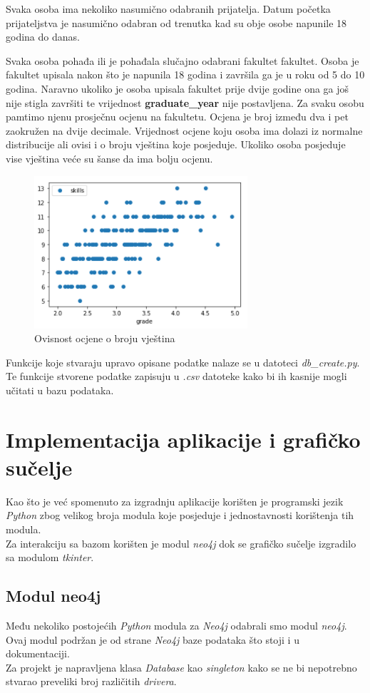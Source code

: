 \documentclass[titlepage, 12pt]{scrartcl}
\begin{document}
Svaka osoba ima nekoliko nasumično odabranih prijatelja. Datum početka prijateljstva je nasumično odabran od trenutka kad su obje osobe napunile 18 godina do danas.

Svaka osoba pohađa ili je pohađala slučajno odabrani fakultet fakultet. Osoba je fakultet upisala nakon što je napunila 18 godina i završila ga je u roku od 5 do 10 godina. Naravno ukoliko je osoba upisala fakultet prije dvije godine ona ga još nije stigla završiti te vrijednost \textbf{graduate\_year} nije postavljena.
Za svaku osobu pamtimo njenu prosječnu ocjenu na fakultetu. Ocjena je broj između dva i pet zaokružen na dvije decimale. Vrijednost ocjene koju osoba ima dolazi iz normalne distribucije ali ovisi i o broju vještina koje posjeduje. Ukoliko osoba posjeduje vise vještina veće su šanse da ima bolju ocjenu.
\begin{figure}
    \centering
    \includegraphics{slike/Grades.png}
    \caption{Ovisnost ocjene o broju vještina}
    \label{fig:hobbies}
\end{figure}

Funkcije koje stvaraju upravo opisane podatke nalaze se u datoteci \emph{db\_create.py}. 
Te funkcije stvorene podatke zapisuju u \emph{.csv} datoteke kako bi ih kasnije mogli učitati u bazu podataka.  
\newpage

\section{Implementacija aplikacije i grafičko sučelje}
Kao što je već spomenuto za izgradnju aplikacije korišten je programski jezik \emph{Python} zbog velikog broja modula koje posjeduje i jednostavnosti korištenja tih modula. \\
Za interakciju sa bazom korišten je modul \emph{neo4j} dok se grafičko sučelje izgradilo sa modulom \emph{tkinter}.
\subsection{Modul neo4j}
Među nekoliko postojećih \emph{Python} modula za \emph{Neo4j} odabrali smo modul \emph{neo4j}. Ovaj modul podržan je od strane \emph{Neo4j} baze podataka što stoji i u dokumentaciji.\\
Za projekt je napravljena klasa \emph{Database} kao \emph{singleton} kako se ne bi nepotrebno stvarao preveliki broj različitih \emph{drivera}.
\end{document}
